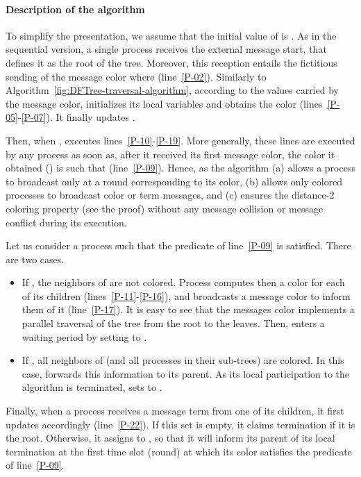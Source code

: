 \documentclass[11pt,english]{article}
\begin{document}
\paragraph{Description of the algorithm}

To simplify the presentation, we assume that the initial value of
 is .  As in the sequential version, a single process 
receives the external message {\sc start}, that defines it as the
root of the tree. Moreover, this reception entails the fictitious sending 
of the message {\sc color}
where  (line~\ref{P-02}).
Similarly to Algorithm~\ref{fig:DFTree-traversal-algorithm}, 
according to the values carried by the message {\sc color}, 
 initializes its local variables and obtains the color 
(lines~\ref{P-05}-\ref{P-07}).  It finally updates .

Then, when ,  executes lines~\ref{P-10}-\ref{P-19}.
More generally, these lines are executed by any process  as soon
as, after it received its first message {\sc color}, the color it
obtained () is such that  (line~\ref{P-09}). Hence, as the algorithm (a)
allows a process to broadcast only at a round corresponding to its
color, (b) allows only colored processes to broadcast {\sc color}
or {\sc term} messages, and (c) ensures the distance-2 coloring
property (see the proof) without any message collision or message
conflict during its execution.


Let us consider a process  such that the predicate of line~\ref{P-09} 
is satisfied. There are two cases. 
\begin{itemize}
\vspace{-0.1cm}
\item If , the neighbors of  are not colored. 
Process  computes then a color for each of its children 
(lines~\ref{P-11}-\ref{P-16}), and broadcasts a message {\sc color} 
to inform them of it (line~\ref{P-17}). It is easy to see that the messages 
{\sc color} implements a parallel traversal of the tree from the 
root to the leaves. Then,   enters a waiting period by 
setting  to . 
\vspace{-0.2cm}
\item If , all neighbors of  (and all processes in their 
sub-trees) are colored. In this case,  forwards this information to 
its parent. As its local participation to the algorithm is terminated,  
 sets  to . 
\end{itemize}

Finally, when a process  receives a message {\sc term} from
one of its children, it first updates   accordingly
(line~\ref{P-22}). If this set is empty, it claims termination if it
is the root. Otherwise, it assigns  to , so that it will
inform its parent of its local termination at the first time slot
(round) at which its color satisfies the predicate of line~\ref{P-09}.
\end{document}
